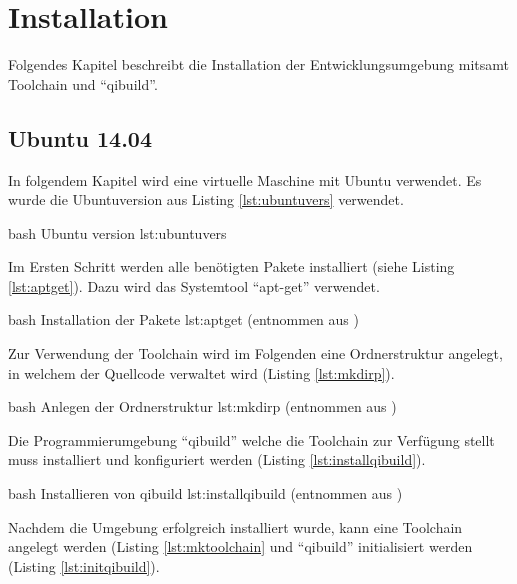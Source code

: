 \chapter{Installation}

    Folgendes Kapitel beschreibt die Installation der Entwicklungsumgebung mitsamt
    Toolchain und ``qibuild''.

    \section{Ubuntu 14.04}

        In folgendem Kapitel wird eine virtuelle Maschine mit Ubuntu
        verwendet.
        Es wurde die Ubuntuversion aus Listing \ref{lst:ubuntuvers} verwendet.

                    {bash}
                    {Ubuntu version}
                    {lst:ubuntuvers}

        Im Ersten Schritt werden alle benötigten Pakete installiert (siehe
        Listing \ref{lst:aptget}).
        Dazu wird das Systemtool ``apt-get'' verwendet.

                    {bash}
                    {Installation der Pakete}
                    {lst:aptget}
        (entnommen aus \cite[S. 5, f.]{projss15})

        Zur Verwendung der Toolchain wird im Folgenden eine Ordnerstruktur
        angelegt, in welchem der Quellcode verwaltet wird (Listing
        \ref{lst:mkdirp}).

                    {bash}
                    {Anlegen der Ordnerstruktur}
                    {lst:mkdirp}
        (entnommen aus \cite[S. 4]{projss15})

        Die Programmierumgebung ``qibuild'' welche die Toolchain zur Verfügung
        stellt muss installiert und konfiguriert werden (Listing
        \ref{lst:installqibuild}).

                    {bash}
                    {Installieren von qibuild}
                    {lst:installqibuild}
        (entnommen aus \cite[S. 5]{projss15})

        Nachdem die Umgebung erfolgreich installiert wurde, kann eine Toolchain
        angelegt werden (Listing \ref{lst:mktoolchain} und ``qibuild''
        initialisiert werden (Listing \ref{lst:initqibuild}).

